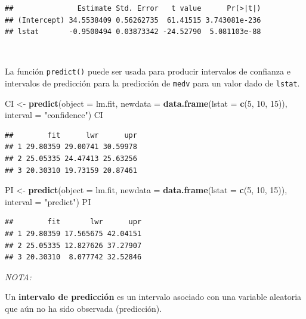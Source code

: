 \documentclass[]{book}
\newenvironment{Shaded}{\begin{snugshade}}{\end{snugshade}}
\newcommand{\KeywordTok}[1]{\textcolor[rgb]{0.13,0.29,0.53}{\textbf{#1}}}
\newcommand{\DataTypeTok}[1]{\textcolor[rgb]{0.13,0.29,0.53}{#1}}
\newcommand{\DecValTok}[1]{\textcolor[rgb]{0.00,0.00,0.81}{#1}}
\newcommand{\StringTok}[1]{\textcolor[rgb]{0.31,0.60,0.02}{#1}}
\newcommand{\NormalTok}[1]{#1}
\begin{document}
\begin{verbatim}
##               Estimate Std. Error   t value      Pr(>|t|)
## (Intercept) 34.5538409 0.56262735  61.41515 3.743081e-236
## lstat       -0.9500494 0.03873342 -24.52790  5.081103e-88
\end{verbatim}

~

La función \texttt{predict()} puede ser usada para producir intervalos
de confianza e intervalos de predicción para la predicción de
\texttt{medv} para un valor dado de \texttt{lstat}.

\begin{Shaded}
\begin{Highlighting}[]
\NormalTok{CI <-}\StringTok{ }\KeywordTok{predict}\NormalTok{(}\DataTypeTok{object =}\NormalTok{ lm.fit, }\DataTypeTok{newdata =} \KeywordTok{data.frame}\NormalTok{(}\DataTypeTok{lstat =} \KeywordTok{c}\NormalTok{(}\DecValTok{5}\NormalTok{, }\DecValTok{10}\NormalTok{, }\DecValTok{15}\NormalTok{)), }
              \DataTypeTok{interval =} \StringTok{"confidence"}\NormalTok{)}
\NormalTok{CI}
\end{Highlighting}
\end{Shaded}

\begin{verbatim}
##        fit      lwr      upr
## 1 29.80359 29.00741 30.59978
## 2 25.05335 24.47413 25.63256
## 3 20.30310 19.73159 20.87461
\end{verbatim}

\begin{Shaded}
\begin{Highlighting}[]
\NormalTok{PI <-}\StringTok{ }\KeywordTok{predict}\NormalTok{(}\DataTypeTok{object =}\NormalTok{ lm.fit, }\DataTypeTok{newdata =} \KeywordTok{data.frame}\NormalTok{(}\DataTypeTok{lstat =} \KeywordTok{c}\NormalTok{(}\DecValTok{5}\NormalTok{, }\DecValTok{10}\NormalTok{, }\DecValTok{15}\NormalTok{)), }
              \DataTypeTok{interval =} \StringTok{"predict"}\NormalTok{)}
\NormalTok{PI}
\end{Highlighting}
\end{Shaded}

\begin{verbatim}
##        fit       lwr      upr
## 1 29.80359 17.565675 42.04151
## 2 25.05335 12.827626 37.27907
## 3 20.30310  8.077742 32.52846
\end{verbatim}

\emph{NOTA:}

Un \textbf{intervalo de predicción} es un intervalo asociado con una
variable aleatoria que aún no ha sido observada (predicción).
\end{document}
